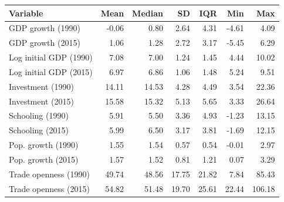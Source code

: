 \begin{tabular}{lrrrrrr}
\toprule
Variable & Mean & Median & SD & IQR & Min & Max \\
\midrule
GDP growth (1990) & -0.06 & 0.80 & 2.64 & 4.31 & -4.61 & 4.09 \\
GDP growth (2015) & 1.06 & 1.28 & 2.72 & 3.17 & -5.45 & 6.29 \\
Log initial GDP (1990) & 7.08 & 7.00 & 1.24 & 1.45 & 4.44 & 10.02 \\
Log initial GDP (2015) & 6.97 & 6.86 & 1.06 & 1.48 & 5.24 & 9.51 \\
Investment (1990) & 14.11 & 14.53 & 4.28 & 4.49 & 3.54 & 22.36 \\
Investment (2015) & 15.58 & 15.32 & 5.13 & 5.65 & 3.33 & 26.64 \\
Schooling (1990) & 5.91 & 5.50 & 3.36 & 4.93 & -1.23 & 13.15 \\
Schooling (2015) & 5.99 & 6.50 & 3.17 & 3.81 & -1.69 & 12.15 \\
Pop. growth (1990) & 1.55 & 1.54 & 0.57 & 0.54 & -0.01 & 2.97 \\
Pop. growth (2015) & 1.57 & 1.52 & 0.81 & 1.21 & 0.07 & 3.29 \\
Trade openness (1990) & 49.74 & 48.56 & 17.75 & 21.82 & 7.84 & 85.43 \\
Trade openness (2015) & 54.82 & 51.48 & 19.70 & 25.61 & 22.44 & 106.18 \\
\bottomrule
\end{tabular}
